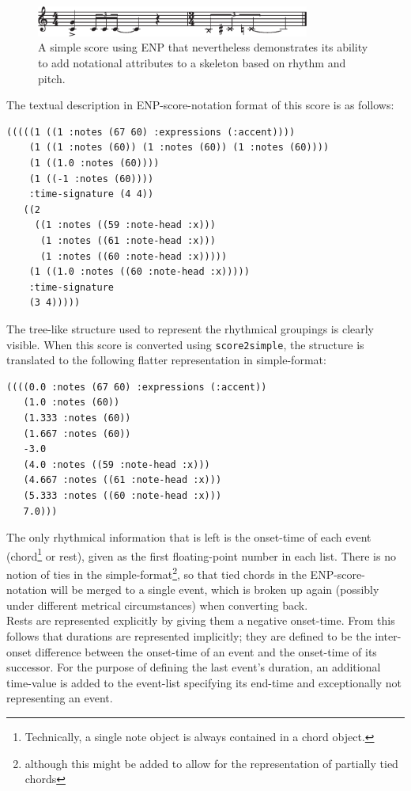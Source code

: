 \documentclass[runningheads,a4paper]{llncs}
\begin{document}
\begin{figure}
  \centering
  \includegraphics[width=9cm]{enp-ex1}
  \caption{A simple score using ENP that nevertheless demonstrates its
    ability to add notational attributes to a skeleton based on rhythm
    and pitch.}
  \label{old:fig:enp-ex1}
\end{figure}

The textual description in ENP-score-notation format of this score is
as follows:

\begin{scriptsize}
\begin{verbatim}
(((((1 ((1 :notes (67 60) :expressions (:accent))))
    (1 ((1 :notes (60)) (1 :notes (60)) (1 :notes (60))))
    (1 ((1.0 :notes (60))))
    (1 ((-1 :notes (60))))
    :time-signature (4 4))
   ((2
     ((1 :notes ((59 :note-head :x)))
      (1 :notes ((61 :note-head :x)))
      (1 :notes ((60 :note-head :x)))))
    (1 ((1.0 :notes ((60 :note-head :x)))))
    :time-signature
    (3 4)))))

\end{verbatim}
\end{scriptsize}

The tree-like structure used to represent the rhythmical groupings is
clearly visible. When this score is converted using
\texttt{score2simple}, the structure is translated to the following
flatter representation in simple-format:

\begin{scriptsize}
\begin{verbatim}
((((0.0 :notes (67 60) :expressions (:accent))
   (1.0 :notes (60))
   (1.333 :notes (60))
   (1.667 :notes (60))
   -3.0
   (4.0 :notes ((59 :note-head :x)))
   (4.667 :notes ((61 :note-head :x)))
   (5.333 :notes ((60 :note-head :x)))
   7.0)))
\end{verbatim}
\end{scriptsize}

The only rhythmical information that is left is the onset-time of each
event (chord\footnote{Technically, a single note object is always
  contained in a chord object.}  or rest), given as the first
floating-point number in each list. There is no notion of ties in the
simple-format\footnote{although this might be added to allow for the
  representation of partially tied chords}, so that tied chords in the
ENP-score-notation will be merged to a single event, which is broken
up again (possibly under different metrical circumstances) when
converting back. \\
Rests are represented explicitly by giving them a negative
onset-time. From this follows that durations are represented
implicitly; they are defined to be the inter-onset difference between
the onset-time of an event and the onset-time of its successor. For
the purpose of defining the last event's duration, an additional
time-value is added to the event-list specifying its
end-time and exceptionally not representing an event.
\end{document}
